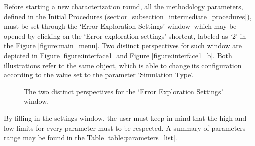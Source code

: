 Before starting a new characterization round, all the methodology parameters, defined in the Initial Procedures (section \ref{subsection_intermediate_procedures}), must be set through the `Error Exploration Settings' window, which may be opened by clicking on the `Error exploration settings' shortcut, labeled as `2' in the Figure \ref{figure:main_menu}. Two distinct perspectives for such window are depicted in Figure \ref{figure:interface1} and Figure \ref{figure:interface1_b}. Both illustrations refer to the same object, which is able to change its configuration according to the value set to the parameter `Simulation Type'.

\begin{figure}[H]
\center
{}
\hfill
{}
\caption{The two distinct perspectives for the `Error Exploration Settings' window.}
\label{figure:interfaces}
\end{figure}

By filling in the settings window, the user must keep in mind that the high and low limits for every parameter must to be respected. A summary of parameters range may be found in the Table \ref{table:parameters_list}.

